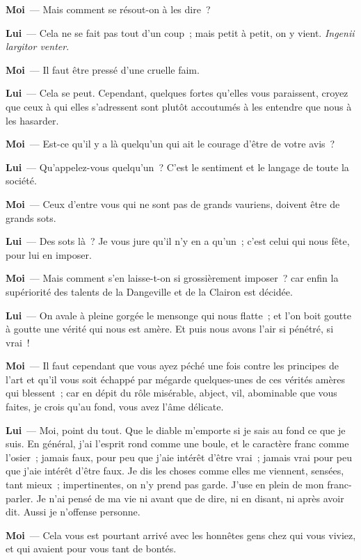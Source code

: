 \documentclass[french,twoside]{book} %
\newcommand{\labelchar}[1]{\textbf{\color{rubric} #1}}
\begin{document}
\labelchar{Moi} — Mais comment se résout-on à les dire ?\par
\labelchar{Lui} — Cela ne se fait pas tout d’un coup ; mais petit à petit, on y vient. \emph{Ingenii largitor venter}.\par
\labelchar{Moi} — Il faut être pressé d’une cruelle faim.\par
\labelchar{Lui} — Cela se peut. Cependant, quelques fortes qu’elles vous paraissent, croyez que ceux à qui elles s’adressent sont plutôt accoutumés à les entendre que nous à les hasarder.\par
\labelchar{Moi} — Est-ce qu’il y a là quelqu’un qui ait le courage d’être de votre avis ?\par
\labelchar{Lui} — Qu’appelez-vous quelqu’un ? C’est le sentiment et le langage de toute la société.\par
\labelchar{Moi} — Ceux d’entre vous qui ne sont pas de grands vauriens, doivent être de grands sots.\par
\labelchar{Lui} — Des sots là ? Je vous jure qu’il n’y en a qu’un ; c’est celui qui nous fête, pour lui en imposer.\par
\labelchar{Moi} — Mais comment s’en laisse-t-on si grossièrement imposer ? car enfin la supériorité des talents de la Dangeville et de la Clairon est décidée.\par
\labelchar{Lui} — On avale à pleine gorgée le mensonge qui nous flatte ; et l’on boit goutte à goutte une vérité qui nous est amère. Et puis nous avons l’air si pénétré, si vrai !\par
\labelchar{Moi} — Il faut cependant que vous ayez péché une fois contre les principes de l’art et qu’il vous soit échappé par mégarde quelques-unes de ces vérités amères qui blessent ; car en dépit du rôle misérable, abject, vil, abominable que vous faites, je crois qu’au fond, vous avez l’âme délicate.\par
\labelchar{Lui} — Moi, point du tout. Que le diable m’emporte si je sais au fond ce que je suis. En général, j’ai l’esprit rond comme une boule, et le caractère franc comme l’osier ; jamais faux, pour peu que j’aie intérêt d’être vrai ; jamais vrai pour peu que j’aie intérêt d’être faux. Je dis les choses comme elles me viennent, sensées, tant mieux ; impertinentes, on n’y prend pas garde. J’use en plein de mon franc-parler. Je n’ai pensé de ma vie ni avant que de dire, ni en disant, ni après avoir dit. Aussi je n’offense personne.\par
\labelchar{Moi} — Cela vous est pourtant arrivé avec les honnêtes gens chez qui vous viviez, et qui avaient pour vous tant de bontés.\par
\end{document}
